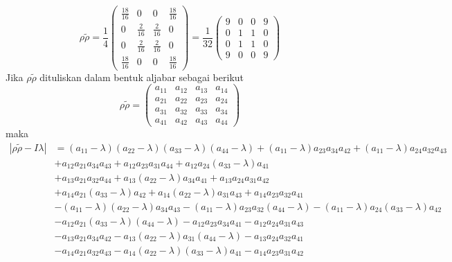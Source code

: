 \begin{equation}
	\rho \tilde{\rho}=\frac{1}{4}
	\begin{pmatrix}
		\frac{18}{16}&0&0&\frac{18}{16}\\
		0&\frac{2}{16}&\frac{2}{16}&0\\
		0&\frac{2}{16}&\frac{2}{16}&0\\
		\frac{18}{16}&0&0&\frac{18}{16}
	\end{pmatrix}
	=\frac{1}{32}
	\begin{pmatrix}
		9&0&0&9\\
		0&1&1&0\\
		0&1&1&0\\
		9&0&0&9
	\end{pmatrix}
\end{equation}
Jika $\rho \tilde{\rho}$ dituliskan dalam bentuk aljabar sebagai berikut
\begin{equation}
	\rho \tilde{\rho}=
	\begin{pmatrix}
		a_{11}&a_{12}&a_{13}&a_{14}\\
		a_{21}&a_{22}&a_{23}&a_{24}\\
		a_{31}&a_{32}&a_{33}&a_{34}\\
		a_{41}&a_{42}&a_{43}&a_{44}
	\end{pmatrix}
\end{equation}
maka
\begin{equation}
	\begin{aligned}
		|\rho \tilde{\rho}-I\lambda|
		&=(a_{11}-\lambda)(a_{22}-\lambda)(a_{33}-\lambda)(a_{44}-\lambda)
		+(a_{11}-\lambda)a_{23}a_{34}a_{42}
		+(a_{11}-\lambda)a_{24}a_{32}a_{43}
		\nonumber\\
		&
		+a_{12}a_{21}a_{34}a_{43}
		+a_{12}a_{23}a_{31}a_{44}
		+a_{12}a_{24}(a_{33}-\lambda)a_{41}
		\nonumber\\
		&
		+a_{13}a_{21}a_{32}a_{44}
		+a_{13}(a_{22}-\lambda)a_{34}a_{41}
		+a_{13}a_{24}a_{31}a_{42}
		\nonumber\\
		&
		+a_{14}a_{21}(a_{33}-\lambda)a_{42}
		+a_{14}(a_{22}-\lambda)a_{31}a_{43}
		+a_{14}a_{23}a_{32}a_{41}
		\nonumber\\
		&
		-(a_{11}-\lambda)(a_{22}-\lambda)a_{34}a_{43}
		-(a_{11}-\lambda)a_{23}a_{32}(a_{44}-\lambda)
		-(a_{11}-\lambda)a_{24}(a_{33}-\lambda)a_{42}
		\nonumber\\
		&
		-a_{12}a_{21}(a_{33}-\lambda)(a_{44}-\lambda)
		-a_{12}a_{23}a_{34}a_{41}
		-a_{12}a_{24}a_{31}a_{43}
		\nonumber\\
		&
		-a_{13}a_{21}a_{34}a_{42}
		-a_{13}(a_{22}-\lambda)a_{31}(a_{44}-\lambda)
		-a_{13}a_{24}a_{32}a_{41}
		\nonumber\\
		&
		-a_{14}a_{21}a_{32}a_{43}
		-a_{14}(a_{22}-\lambda)(a_{33}-\lambda)a_{41}
		-a_{14}a_{23}a_{31}a_{42}
	\end{aligned}
\end{equation}
